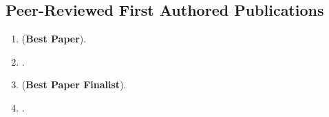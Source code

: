 \documentclass[margin,line]{res}
\begin{document}
\begin{resume}
%
%
\section{\sc Peer-Reviewed First Authored Publications}
\begin{enumerate}
	\item {} (\textbf{Best Paper}).
	\item {}.
	\item {} (\textbf{Best Paper Finalist}).
	\item {}.


\end{enumerate}
\end{resume}
\end{document}

